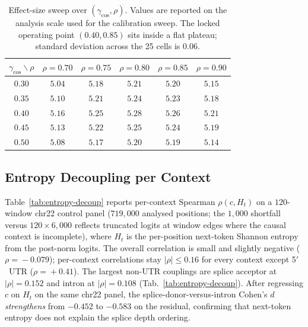 \documentclass{article}
\theoremstyle{plain}
\theoremstyle{definition}
\theoremstyle{remark}
\begin{document}
\begin{table}[!htbp]
  \caption{Effect-size sweep over $(\gamma_{\cos}, \rho)$. Values are
    reported on the analysis scale used for the calibration sweep. The locked
    operating point $(0.40, 0.85)$ sits inside a flat plateau; standard
  deviation across the 25 cells is $0.06$.}
  \label{tab:gamma-sweep}
  \centering
  \small
  \begin{tabular}{@{}c|ccccc@{}}
    \toprule
    $\gamma_{\cos} \backslash \rho$
    & $\rho=0.70$ & $\rho=0.75$ & $\rho=0.80$ & $\rho=0.85$ & $\rho=0.90$ \\
    \midrule
    $0.30$ & $5.04$ & $5.18$ & $5.21$ & $5.20$ & $5.15$ \\
    $0.35$ & $5.10$ & $5.21$ & $5.24$ & $5.23$ & $5.18$ \\
    $0.40$ & $5.16$ & $5.25$ & $\mathbf{5.28}$ & $\mathbf{5.26}$ & $5.21$ \\
    $0.45$ & $5.13$ & $5.22$ & $5.25$ & $5.24$ & $5.19$ \\
    $0.50$ & $5.08$ & $5.17$ & $5.20$ & $5.19$ & $5.14$ \\
    \bottomrule
  \end{tabular}
\end{table}

\subsection{Entropy Decoupling per Context}
\label{app:entropy-decoup}

Table~\ref{tab:entropy-decoup} reports per-context Spearman $\rho(c,
H_t)$ on a $120$-window chr22 control panel ($719{,}000$ analysed positions; the
  $1{,}000$ shortfall versus $120\!\times\!6{,}000$ reflects truncated logits at
window edges where the causal context is incomplete), where
$H_t$ is the per-position next-token Shannon entropy from the post-norm
logits. The overall correlation is small and slightly negative
($\rho\!=\!-0.079$); per-context correlations stay $|\rho|\!\leq\!0.16$
for every context except 5$'$~UTR ($\rho\!=\!+0.41$). The largest
non-UTR couplings are splice acceptor at $|\rho|\!=\!0.152$ and intron
at $|\rho|\!=\!0.108$ (Tab.~\ref{tab:entropy-decoup}). After regressing
$c$ on $H_t$ on the same chr22 panel, the splice-donor-versus-intron
Cohen's $d$ \emph{strengthens} from $-0.452$ to $-0.583$ on the
residual, confirming that next-token entropy does not explain the
splice depth ordering.
\end{document}
